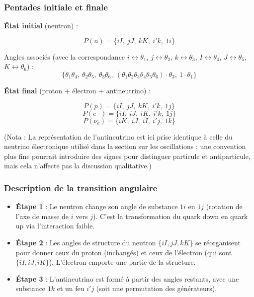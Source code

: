 \documentclass[11pt]{article}
\providecommand{\tightlist}{%
\setlength{\itemsep}{2pt}\setlength{\parskip}{6pt}
}
\begin{document}
\hypertarget{pentades-initiale-et-finale}{%
\subsubsection{Pentades initiale et
finale}\label{pentades-initiale-et-finale}}

\textbf{État initial} (neutron) :

\[
P(n) = \{ iI,\ jJ,\ kK,\ i'k,\ 1i \}
\]

Angles associés (avec la correspondance \(i \leftrightarrow \theta_1\),
\(j \leftrightarrow \theta_2\), \(k \leftrightarrow \theta_3\),
\(I \leftrightarrow \theta_4\), \(J \leftrightarrow \theta_5\),
\(K \leftrightarrow \theta_6\)) : \[
\{\theta_1\theta_4,\ \theta_2\theta_5,\ \theta_3\theta_6,\ (\theta_1\theta_2\theta_3\theta_4\theta_5\theta_6)\cdot\theta_3,\ 1\cdot\theta_1\}
\]

\textbf{État final} (proton + électron + antineutrino) :

\[
P(p) = \{ iI,\ jJ,\ kK,\ i'k,\ 1j \}
\] \[
P(e^-) = \{ iI,\ iJ,\ iK,\ i'k,\ 1j \}
\] \[
P(\bar{\nu}_e) = \{ iK,\ iJ,\ iI,\ i'j,\ 1k \}
\]

(Nota : La représentation de l'antineutrino est ici prise identique à
celle du neutrino électronique utilisé dans la section sur les
oscillations ; une convention plus fine pourrait introduire des signes
pour distinguer particule et antiparticule, mais cela n'affecte pas la
discussion qualitative.)

\hypertarget{description-de-la-transition-angulaire}{%
\subsubsection{Description de la transition
angulaire}\label{description-de-la-transition-angulaire}}

\begin{itemize}
\tightlist
\item
  \textbf{Étape 1} : Le neutron change son angle de substance \(1i\) en
  \(1j\) (rotation de l'axe de masse de \(i\) vers \(j\)). C'est la
  transformation du quark down en quark up via l'interaction faible.
\item
  \textbf{Étape 2} : Les angles de structure du neutron
  \(\{iI, jJ, kK\}\) se réorganisent pour donner ceux du proton
  (inchangés) et ceux de l'électron (qui sont \(\{iI, iJ, iK\}\)).
  L'électron emporte une partie de la structure.
\item
  \textbf{Étape 3} : L'antineutrino est formé à partir des angles
  restants, avec une substance \(1k\) et un feu \(i'j\) (soit une
  permutation des générateurs).
\end{itemize}
\end{document}
